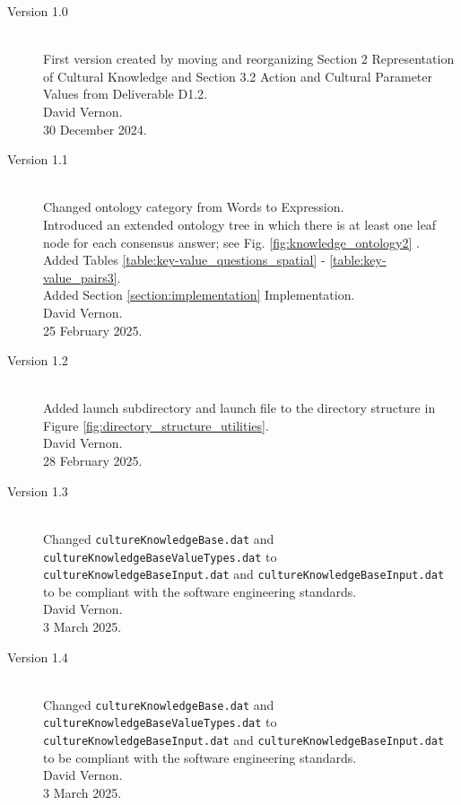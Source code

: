 \documentclass{CSSRforAfrica}
\begin{document}
\begin{description}

\item [Version 1.0]~\\
First version created by moving and reorganizing Section 2 Representation of Cultural Knowledge and Section 3.2 Action and Cultural Parameter Values from Deliverable D1.2. \\
David Vernon.\\
30 December 2024.   \\                                           

\item [Version 1.1]~\\
Changed ontology category from Words to Expression.\\
Introduced an extended ontology tree  in which there is at least one leaf node for each consensus answer; see  Fig. \ref{fig:knowledge_ontology2} .\\
Added Tables \ref{table:key-value_questions_spatial} - \ref{table:key-value_pairs3}.\\
Added Section \ref{section:implementation} Implementation.\\
David Vernon.\\
25 February 2025. \\   

\item [Version 1.2]~\\
Added launch subdirectory and launch file to the directory structure in Figure \ref{fig:directory_structure_utilities}.\\
David Vernon.\\
28 February 2025. \\ 

\item [Version 1.3]~\\
Changed {\tt \small cultureKnowledgeBase.dat} and {\tt \small cultureKnowledgeBaseValueTypes.dat} to {\tt \small cultureKnowledgeBaseInput.dat} and {\tt \small cultureKnowledgeBaseInput.dat} to be compliant with the software engineering standards.\\
David Vernon.\\
3 March 2025. \\ 


\item [Version 1.4]~\\
Changed {\tt \small cultureKnowledgeBase.dat} and {\tt \small cultureKnowledgeBaseValueTypes.dat} to {\tt \small cultureKnowledgeBaseInput.dat} and {\tt \small cultureKnowledgeBaseInput.dat} to be compliant with the software engineering standards.\\
David Vernon.\\
3 March 2025. \\ 


\end{description}
\end{document}
